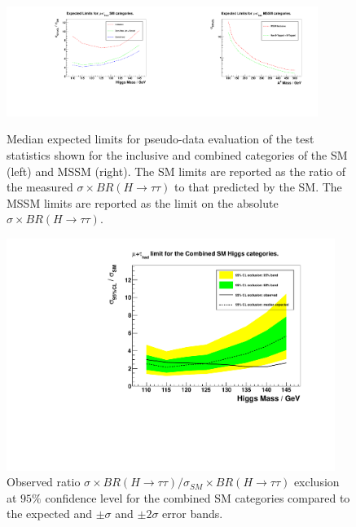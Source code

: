 \begin{figure}[ht]
\centering
\centerline{\includegraphics[width=0.45\textwidth]{plots/limitsAHtoMuTau_expected_sm.pdf}\includegraphics[width=0.45\textwidth]{plots/limitsAHtoMuTau_expected_mssm.pdf}}
\caption{
  Median expected limits for pseudo-data evaluation of the test statistics shown for the inclusive and combined categories of the SM (left) and MSSM (right). 
  The SM limits are reported as the ratio of the measured $\sigma\times BR(H\rightarrow\tau\tau)$  to that predicted by the SM.
  The MSSM limits are reported as the limit on the absolute $\sigma\times BR(H\rightarrow\tau\tau)$.
}
\label{fig:expectedlimits}
\end{figure}

\begin{figure}[ht]
\centering
\includegraphics[width=0.95\textwidth]{plots/limitsAHtoMuTau_svFit_sm.pdf}
\caption{Observed ratio $\sigma\times BR(H\rightarrow\tau\tau)/\sigma_{SM}\times BR(H\rightarrow\tau\tau)$ exclusion at $95\%$ confidence level for the combined SM categories compared to the expected and $\pm\sigma$ and $\pm 2\sigma$ error bands.}
\label{fig:smlimits}
\end{figure}

